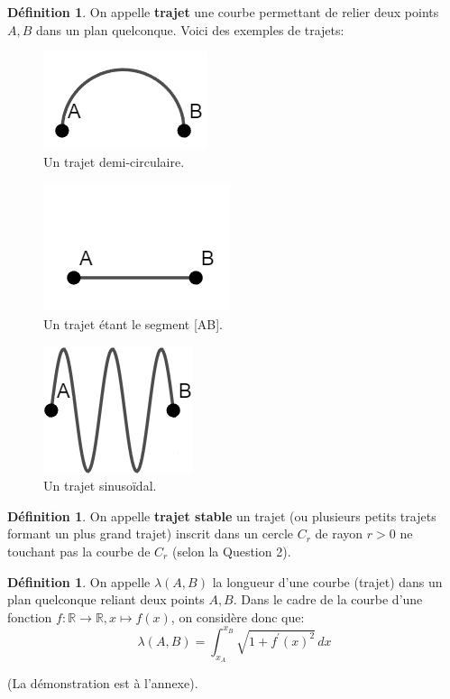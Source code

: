 \documentclass{amsart}
\theoremstyle{definition}
\newtheorem{definition}[theorem]{Définition}
\theoremstyle{remark}
\numberwithin{equation}{section}
\begin{document}
\begin{definition}
  On appelle \textbf{trajet} une courbe permettant de relier deux points $A,B$ dans un plan quelconque. Voici des exemples de trajets:

  \begin{figure}[H]
    \centering
    \includegraphics[scale=0.5]{images/circle.png}
    \caption{Un trajet demi-circulaire.}
  \end{figure}

  \begin{figure}[H]
    \centering
    \includegraphics[scale=0.5]{images/line.png}
    \caption{Un trajet étant le segment [AB].}
  \end{figure}

  \begin{figure}[H]
    \centering
    \includegraphics[scale=0.5]{images/sinus.png}
    \caption{Un trajet sinusoïdal.}
  \end{figure}
\end{definition}

\begin{definition}
  On appelle \textbf{trajet stable} un trajet (ou plusieurs petits trajets formant un plus grand trajet) inscrit dans un cercle $C_r$ de rayon $r>0$ ne touchant pas la courbe de $C_r$ (selon la Question 2).
\end{definition}

\begin{definition}
  On appelle $\lambda(A,B)$ la longueur d'une courbe (trajet) dans un plan quelconque reliant deux points $A,B$. Dans le cadre de la courbe d'une fonction $f:\mathbb{R}\longrightarrow \mathbb{R}, x\longmapsto f(x)$,
  on considère donc que: \[\lambda(A,B)=\int_{x_A}^{x_B} \sqrt{1+{f^\prime}(x)^2} \,dx\]

  (La démonstration est à l'annexe).
\end{definition}
\end{document}
